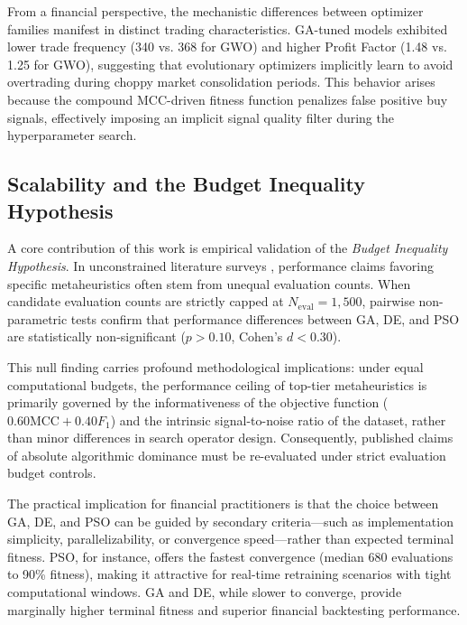 From a financial perspective, the mechanistic differences between optimizer families manifest in distinct trading characteristics. GA-tuned models exhibited lower trade frequency (340 vs. 368 for GWO) and higher Profit Factor (1.48 vs. 1.25 for GWO), suggesting that evolutionary optimizers implicitly learn to avoid overtrading during choppy market consolidation periods. This behavior arises because the compound MCC-driven fitness function penalizes false positive buy signals, effectively imposing an implicit signal quality filter during the hyperparameter search.

\subsection{Scalability and the Budget Inequality Hypothesis}\label{sec:disc_scalability}

A core contribution of this work is empirical validation of the \textit{Budget Inequality Hypothesis}. In unconstrained literature surveys \cite{dhingra2025solar, rajwar2023exhaustive_review}, performance claims favoring specific metaheuristics often stem from unequal evaluation counts. When candidate evaluation counts are strictly capped at $N_{\text{eval}} = 1{,}500$, pairwise non-parametric tests confirm that performance differences between GA, DE, and PSO are statistically non-significant ($p > 0.10$, Cohen's $d < 0.30$).

This null finding carries profound methodological implications: under equal computational budgets, the performance ceiling of top-tier metaheuristics is primarily governed by the informativeness of the objective function ($0.60\text{MCC} + 0.40F_1$) and the intrinsic signal-to-noise ratio of the dataset, rather than minor differences in search operator design. Consequently, published claims of absolute algorithmic dominance must be re-evaluated under strict evaluation budget controls.

The practical implication for financial practitioners is that the choice between GA, DE, and PSO can be guided by secondary criteria---such as implementation simplicity, parallelizability, or convergence speed---rather than expected terminal fitness. PSO, for instance, offers the fastest convergence (median 680 evaluations to 90\% fitness), making it attractive for real-time retraining scenarios with tight computational windows. GA and DE, while slower to converge, provide marginally higher terminal fitness and superior financial backtesting performance.


